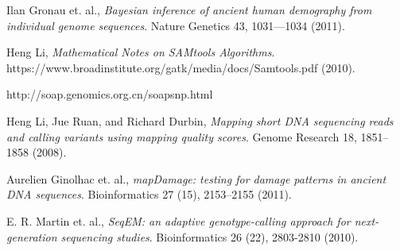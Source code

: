 \documentclass{article}
\begin{document}
\listoftodos

\begin{thebibliography}{9}

  Ilan Gronau et. al.,
  \emph{Bayesian inference of ancient human demography from individual genome sequences}.
  Nature Genetics 43, 1031---1034 (2011).

  Heng Li,
  \emph{Mathematical Notes on SAMtools Algorithms}.
  https://www.broadinstitute.org/gatk/media/docs/Samtools.pdf (2010).

  http://soap.genomics.org.cn/soapsnp.html

  Heng Li, Jue Ruan, and Richard Durbin,
  \emph{Mapping short DNA sequencing reads and calling variants using mapping quality scores}.
  Genome Research 18, 1851--1858 (2008). 

  Aurelien Ginolhac et. al.,
  \emph{mapDamage: testing for damage patterns in ancient DNA sequences}.
  Bioinformatics 27 (15), 2153--2155 (2011).

  E. R. Martin et. al.,
  \emph{SeqEM: an adaptive genotype-calling approach for next-generation
  sequencing studies}.
  Bioinformatics 26 (22), 2803-2810 (2010).
\end{thebibliography}
\end{document}
